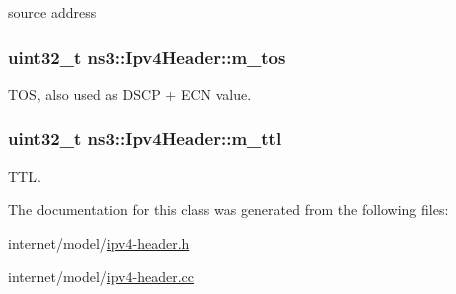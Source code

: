 source address 

\subsubsection[{\texorpdfstring{m\+\_\+tos}{m_tos}}]{\setlength{\rightskip}{0pt plus 5cm}uint32\+\_\+t ns3\+::\+Ipv4\+Header\+::m\+\_\+tos\hspace{0.3cm}{\ttfamily [private]}}\hypertarget{classns3_1_1Ipv4Header_a63a9a2088793d46323e2a2a5cce4260b}{}\label{classns3_1_1Ipv4Header_a63a9a2088793d46323e2a2a5cce4260b}


T\+OS, also used as D\+S\+CP + E\+CN value. 

\subsubsection[{\texorpdfstring{m\+\_\+ttl}{m_ttl}}]{\setlength{\rightskip}{0pt plus 5cm}uint32\+\_\+t ns3\+::\+Ipv4\+Header\+::m\+\_\+ttl\hspace{0.3cm}{\ttfamily [private]}}\hypertarget{classns3_1_1Ipv4Header_a2c4861b795acda1a7d7f2e322afa2f96}{}\label{classns3_1_1Ipv4Header_a2c4861b795acda1a7d7f2e322afa2f96}


T\+TL. 



The documentation for this class was generated from the following files\+:\begin{DoxyCompactItemize}
\item 
internet/model/\hyperlink{ipv4-header_8h}{ipv4-\/header.\+h}\item 
internet/model/\hyperlink{ipv4-header_8cc}{ipv4-\/header.\+cc}\end{DoxyCompactItemize}
